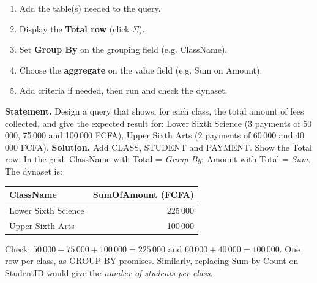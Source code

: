 \documentclass[11pt]{article}
\begin{document}
\begin{methode}
\begin{enumerate}
\item Add the table(s) needed to the query.
\item Display the \textbf{Total row} (click $\Sigma$).
\item Set \textbf{Group By} on the grouping field (e.g. ClassName).
\item Choose the \textbf{aggregate} on the value field (e.g. Sum on Amount).
\item Add criteria if needed, then run and check the dynaset.
\end{enumerate}
\end{methode}

\begin{exoresolu}
\textbf{Statement.} Design a query that shows, for each class, the total amount of fees collected, and give the expected result for: Lower Sixth Science (3 payments of 50\,000, 75\,000 and 100\,000 FCFA), Upper Sixth Arts (2 payments of 60\,000 and 40\,000 FCFA).
\tcblower
\textbf{Solution.} Add CLASS, STUDENT and PAYMENT. Show the Total row. In the grid: ClassName with Total = \emph{Group By}; Amount with Total = \emph{Sum}. The dynaset is:

\begin{center}
\begin{tabular}{|l|r|}
\hline
\rowcolor{popblueL} \textbf{ClassName} & \textbf{SumOfAmount (FCFA)} \\
\hline
Lower Sixth Science & 225\,000 \\
\hline
Upper Sixth Arts & 100\,000 \\
\hline
\end{tabular}
\end{center}

Check: $50\,000 + 75\,000 + 100\,000 = 225\,000$ and $60\,000 + 40\,000 = 100\,000$. One row per class, as GROUP BY promises. Similarly, replacing Sum by Count on StudentID would give the \emph{number of students per class}.
\end{exoresolu}
\end{document}
